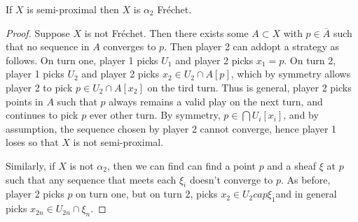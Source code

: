 \documentclass{article}
\begin{document}
\begin{prop}
    If \(X\) is semi-proximal then \(X\) is \(\alpha_2\) Fréchet. 
\end{prop}
\begin{proof}
    Suppose \(X\) is not Fréchet. Then there exists some \(A \subset X\) with \(p \in \overline{A}\) such that no sequence in \(A\) converges to \(p\). Then player 2 can addopt a strategy as follows. On turn one, player 1 picks \(U_1\) and player 2 picks \(x_1 = p\). On turn 2, player 1 picks \(U_2\) and player 2 picks \(x_2 \in U_2\cap A[p] \), which by symmetry allows player 2 to pick \(p \in U_2\cap A[x_2]\) on the tird turn. Thus is general, player 2 picks points in \(A\) such that \(p\) always remains a valid play on the next turn, and continues to pick \(p\) ever other turn. By symmetry, \(p \in \bigcap U_i[x_i]\), and by assumption, the sequence chosen by player 2 cannot converge, hence player 1 loses so that \(X\) is not semi-proximal.

    Similarly, if \(X\) is not \(\alpha_2\), then we can find can find a point \(p\) and a sheaf \(\xi\) at \(p\) such that any sequence that meets each \(\xi_i\) doesn't converge to \(p\). As before, player 2 picks \(p\) on turn one, but on turn 2, picks \(x_2 \in U_2 cap \xi_1\)and in general picks \(x_{2n} \in U_{2n}\cap\xi_{n}\). 
\end{proof}
\end{document}
